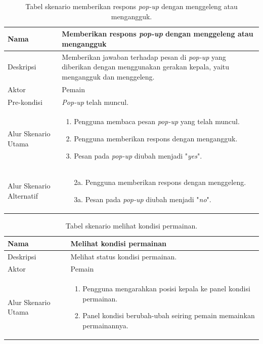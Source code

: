\begin{table}[]
    \centering
    \begin{tabular}{|p{3cm}|p{10cm}|}
    \hline
        Nama & Memberikan respons \textit{pop-up} dengan menggeleng atau mengangguk\\
    \hline
    \hline
        Deskripsi & Memberikan jawaban terhadap pesan di \textit{pop-up} yang diberikan dengan menggunakan gerakan kepala, yaitu mengangguk dan menggeleng.\\
    \hline
        Aktor & Pemain \\
    \hline
        Pre-kondisi & \textit{Pop-up} telah muncul. \\
    \hline
        Alur Skenario Utama & 
        \begin{enumerate}
            \item Pengguna membaca pesan \textit{pop-up} yang telah muncul.
            \item Pengguna memberikan respons dengan mengangguk.
            \item Pesan pada \textit{pop-up} diubah menjadi "\textit{yes}".
        \end{enumerate}\\
    \hline
        Alur Skenario Alternatif & 
        \begin{enumerate}
            \item [2a.] Pengguna memberikan respons dengan menggeleng.
            \item [3a.] Pesan pada \textit{pop-up} diubah menjadi "\textit{no}".
        \end{enumerate}\\
    \hline
    \end{tabular}
    \caption{Tabel skenario memberikan respons \textit{pop-up} dengan menggeleng atau mengangguk.}
    \label{tab:tabel_skenario_memberikan_respons_pop-up_dengan_menggeleng_atau_mengangguk}
\end{table}


\begin{table}[]
    \centering
    \begin{tabular}{|p{3cm}|p{10cm}|}
    \hline
        Nama & Melihat kondisi permainan\\
    \hline
    \hline
        Deskripsi & Melihat status kondisi permainan.\\
    \hline
        Aktor & Pemain \\
    \hline
        Alur Skenario Utama & 
        \begin{enumerate}
            \item Pengguna mengarahkan posisi kepala ke panel kondisi permainan.
            \item Panel kondisi berubah-ubah seiring pemain memainkan permainannya.
        \end{enumerate}\\
    \hline
    \end{tabular}
    \caption{Tabel skenario melihat kondisi permainan.}
    \label{tab:tabel_skenario_melihat_kondisi_permainan}
\end{table}


